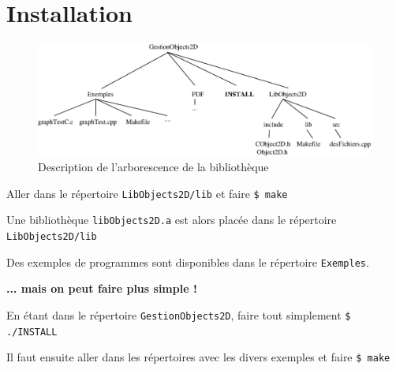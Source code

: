 \documentclass[12pt]{article}
\begin{document}

\section{Installation}

\vspace{-0.5cm}
\begin{figure}[hbtp]
\begin{center}
\includegraphics[width=15.5cm]{fig/arbo}
\end{center}
\caption{Description de l'arborescence de la biblioth\`eque}
\end{figure}

Aller dans le r\'epertoire {\tt LibObjects2D/lib}
et faire {\tt \$ make}

Une biblioth\`eque {\tt libObjects2D.a} est alors plac\'ee dans le r\'epertoire
{\tt LibObjects2D/lib}

Des exemples de programmes sont disponibles dans le r\'epertoire
{\tt Exemples}.

\vspace{0.5cm}
{\bf ... mais on peut faire plus simple !}

\vspace{0.3cm}

En \'etant dans le r\'epertoire {\tt GestionObjects2D}, faire tout
simplement {\tt \$ ./INSTALL}

Il faut ensuite aller dans les r\'epertoires avec les divers exemples
et faire {\tt \$ make}
\end{document}
